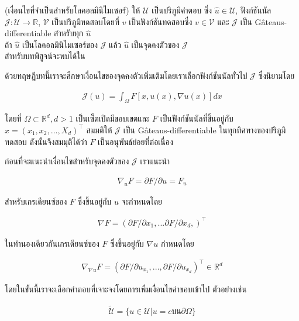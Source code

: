 \begin{Theorem}
    (เงื่อนไขที่จำเป็นสำหรับโลคอลมินิไมเซอร์) ให้ $\mathcal{U}$ เป็นปริภูมิคำตอบ ซึ่ง $\hat{u} \in \mathcal{U}$, ฟังก์ชันนัล $\mathcal{J} : \mathcal{U} \rightarrow \mathbb{R}$, $\mathcal{V}$ เป็นปริภูมิทดสอบโดยที่ $v$ เป็นฟังก์ชันทดสอบซึ่ง $v \in \mathcal{V}$ และ $\mathcal{J}$ เป็น G\^{a}teaus-differentiable สำหรับทุก $\hat{u}$\\
    ถ้า $\hat{u}$ เป็นโลคอลมินิไมเซอร์ของ $\mathcal{J}$ แล้ว $\hat{u}$ เป็นจุดคงตัวของ  $\mathcal{J}$\\
    สำหรับบทพิสูจน์จะพบได้ใน \cite{nessery_minimizer}
    \label{theroem:nessery_minimizer}
\end{Theorem}

ด้วยทฤษฎีบทนี้เราจะศึกษาเงื่อนไขของจุดคงตัวเพิ่มเติมโดยเราเลือกฟังก์ชันนัลทั่วไป $\mathcal{J}$ ซึ่งนิยามโดย

\begin{align}
    \mathcal{J}(u) = \int_{\Omega} F[x,u(x),\nabla u(x)] dx
    \label{equation:general_functional}
\end{align}

โดยที่ $\Omega \subset \mathbb{R}^{d}, d>1$ เป็นเซ็ตเปิดมีขอบเขตและ $F$ เป็นฟังก์ชันนัลที่ขึ้นอยู่กับ $x=(x_1,x_2,...,X_d)^\top$ สมมติให้ $\mathcal{J}$ เป็น G\^{a}teaus-differentiable ในทุกทิศทางของปริภูมิทดสอบ ดังนั้นจึงสมมุติได้ว่า $F$  เป็นอนุพันธ์ย่อยที่ต่อเนื่อง

ก่อนที่จะแนะนำเงื่อนไขสำหรับจุดคงตัวของ $\mathcal{J}$ เราแนะนำ

\begin{align}
    \nabla_{u} F = \partial F / \partial u = F_u
\end{align}

สำหรับเกรเดียนซ์ของ $F$ ซึ่งขึ้นอยู่กับ $u$ จะกำหนดโดย

\begin{align}
    \nabla F = (\partial F / \partial x_1, ... \partial F / \partial x_d, )^\top
\end{align}

ในทำนองเดียวกันเกรเดียนซ์ของ $F$ ซึ่งขึ้นอยู่กับ $\nabla u$ กำหนดโดย

\begin{align}
    \nabla_{\nabla u} F = (\partial F / \partial u_{x_1},..., \partial F / \partial u_{x_d})^\top \in \mathbb{R}^d
\end{align}

โดยในขั้นนี้เราจะเลือกคำตอบที่เจาะจงโดยการเพิ่มเงื่อนไขค่าขอบเข้าไป ตัวอย่างเช่น

\begin{align}
    \tilde{\mathcal{U}} = \{u \in \mathcal{U} | u = c \text{บน} \partial \Omega \}
\end{align}

